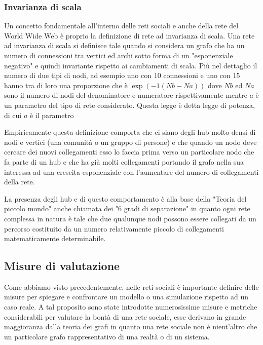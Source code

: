 \subsubsection{Invarianza di scala}
Un concetto fondamentale all'interno delle reti sociali e anche della rete del World Wide Web è proprio la definizione di rete ad invarianza di scala.
Una rete ad invarianza di scala si definisce tale quando si considera un grafo che ha un numero di connessioni tra vertici ed archi sotto forma di un "esponenziale negativo" e quindi invariante rispetto ai cambiamenti di scala.
Più nel dettaglio il numero di due tipi di nodi, ad esempio uno con 10 connessioni e uno con 15 hanno tra di loro una proporzione che è $\exp(-1 (Nb-Na)) $ dove $Nb$ ed $Na$ sono il numero di nodi del denominatore e numeratore rispettivamente mentre $a$ è un parametro del tipo di rete considerato. Questa legge è detta legge di potenza, di cui $a$ è il parametro \cite{ReteInvarianzaScala}

Empiricamente questa definizione comporta che ci siano degli hub molto densi di nodi e vertici (una comunità o un gruppo di persone) e che quando un nodo deve cercare dei nuovi collegamenti esso lo faccia prima verso un particolare nodo che fa parte di un hub e che ha già molti collegamenti portando il grafo nella sua interessa ad una crescita esponenziale con l'aumentare del numero di collegamenti della rete.

La presenza degli hub e di questo comportamento è alla base della "Teoria del piccolo mondo" anche chiamata dei "6 gradi di separazione" in quanto ogni rete complessa in natura è tale che due qualunque nodi possono essere collegati da un percorso costituito da un numero relativamente piccolo di collegamenti matematicamente determinabile. \cite{TeoriaPiccoloMondo}

\subsection{Misure di valutazione}

Come abbiamo visto precedentemente, nelle reti sociali è importante definire delle misure per spiegare e confrontare un modello o una simulazione rispetto ad un caso reale.
A tal proposito sono state introdotte numerosissime misure e metriche considerabili per valutare la bontà di una rete sociale, esse derivano in grande maggioranza dalla teoria dei grafi in quanto una rete sociale non è nient'altro che un particolare grafo rappresentativo di una realtà o di un sistema.

